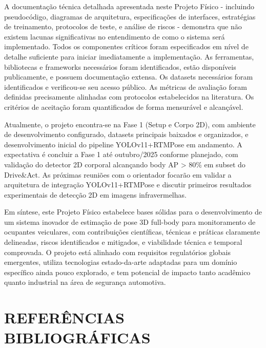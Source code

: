 \documentclass[12pt, a4paper]{article}
\begin{document}
A documentação técnica detalhada apresentada neste Projeto Físico - incluindo pseudocódigo, diagramas de arquitetura, especificações de interfaces, estratégias de treinamento, protocolos de teste, e análise de riscos - demonstra que não existem lacunas significativas no entendimento de como o sistema será implementado. Todos os componentes críticos foram especificados em nível de detalhe suficiente para iniciar imediatamente a implementação. As ferramentas, bibliotecas e frameworks necessários foram identificados, estão disponíveis publicamente, e possuem documentação extensa. Os datasets necessários foram identificados e verificou-se seu acesso público. As métricas de avaliação foram definidas precisamente alinhadas com protocolos estabelecidos na literatura. Os critérios de aceitação foram quantificados de forma mensurável e alcançável.

Atualmente, o projeto encontra-se na Fase 1 (Setup e Corpo 2D), com ambiente de desenvolvimento configurado, datasets principais baixados e organizados, e desenvolvimento inicial do pipeline YOLOv11+RTMPose em andamento. A expectativa é concluir a Fase 1 até outubro/2025 conforme planejado, com validação do detector 2D corporal alcançando body AP > 80\% em subset do Drive\&Act. As próximas reuniões com o orientador focarão em validar a arquitetura de integração YOLOv11+RTMPose e discutir primeiros resultados experimentais de detecção 2D em imagens infravermelhas.

Em síntese, este Projeto Físico estabelece bases sólidas para o desenvolvimento de um sistema inovador de estimação de pose 3D full-body para monitoramento de ocupantes veiculares, com contribuições científicas, técnicas e práticas claramente delineadas, riscos identificados e mitigados, e viabilidade técnica e temporal comprovada. O projeto está alinhado com requisitos regulatórios globais emergentes, utiliza tecnologias estado-da-arte adaptadas para um domínio específico ainda pouco explorado, e tem potencial de impacto tanto acadêmico quanto industrial na área de segurança automotiva.

\section{REFERÊNCIAS BIBLIOGRÁFICAS}
\end{document}
